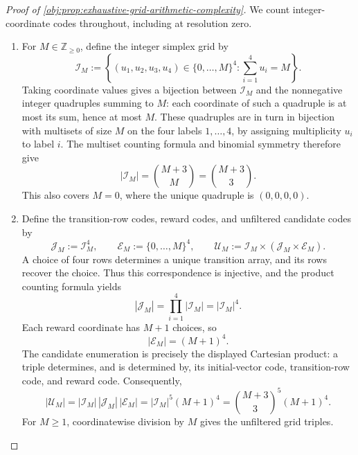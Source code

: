 \documentclass[11pt]{article}
\begin{document}
\begin{proof}[Proof of \cref{obj:prop:exhaustive-grid-arithmetic-complexity}]
We count integer-coordinate codes throughout, including at resolution zero.
\begin{enumerate}
\item For \(M\in\mathbb Z_{\ge0}\), define the integer simplex grid by
\[
\mathcal I_M
:=
\left\{
(u_1,u_2,u_3,u_4)\in\{0,\ldots,M\}^{4}:
\sum_{i=1}^{4}u_i=M
\right\}.
\]
Taking coordinate values gives a bijection between \(\mathcal I_M\) and the nonnegative integer quadruples summing to \(M\): each coordinate of such a quadruple is at most its sum, hence at most \(M\). These quadruples are in turn in bijection with multisets of size \(M\) on the four labels \(1,\ldots,4\), by assigning multiplicity \(u_i\) to label \(i\). The multiset counting formula and binomial symmetry therefore give
\[
|\mathcal I_M|
=
\binom{M+3}{M}
=
\binom{M+3}{3}.
\]
This also covers \(M=0\), where the unique quadruple is \((0,0,0,0)\).

\item Define the transition-row codes, reward codes, and unfiltered candidate codes by
\[
\mathcal J_M:=\mathcal I_M^{4},
\qquad
\mathcal E_M:=\{0,\ldots,M\}^{4},
\qquad
\mathcal U_M:=\mathcal I_M\times
   (\mathcal J_M\times\mathcal E_M).
\]
A choice of four rows determines a unique transition array, and its rows recover the choice. Thus this correspondence is injective, and the product counting formula yields
\[
|\mathcal J_M|
=
\prod_{i=1}^{4}|\mathcal I_M|
=
|\mathcal I_M|^{4}.
\]
Each reward coordinate has \(M+1\) choices, so
\[
|\mathcal E_M|=(M+1)^4.
\]
The candidate enumeration is precisely the displayed Cartesian product: a triple determines, and is determined by, its initial-vector code, transition-row code, and reward code. Consequently,
\[
|\mathcal U_M|
=
|\mathcal I_M|\,|\mathcal J_M|\,|\mathcal E_M|
=
|\mathcal I_M|^{5}(M+1)^4
=
\binom{M+3}{3}^{5}(M+1)^4.
\]
For \(M\ge1\), coordinatewise division by \(M\) gives the unfiltered grid triples.


\end{enumerate}
\end{proof}
\end{document}

